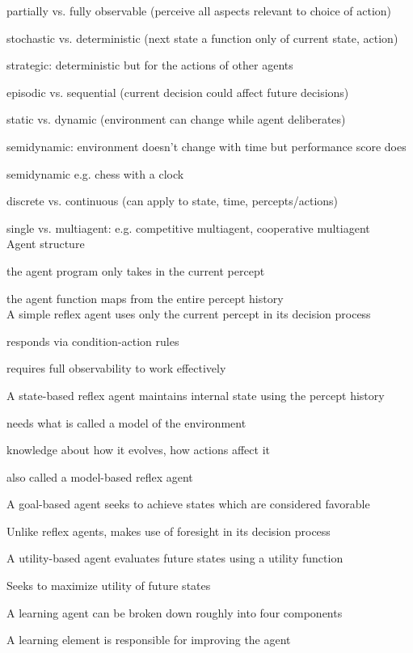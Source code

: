 \documentclass[12pt]{article}
\begin{document}
partially vs. fully observable (perceive all aspects relevant to choice of action)

stochastic vs. deterministic (next state a function only of current state, action)

strategic: deterministic but for the actions of other agents

episodic vs. sequential (current decision could affect future decisions)

static vs. dynamic (environment can change while agent deliberates)

semidynamic: environment doesn't change with time but performance score does

semidynamic e.g. chess with a clock

discrete vs. continuous (can apply to state, time, percepts/actions)

single vs. multiagent: e.g. competitive multiagent, cooperative multiagent\\

\noindent
Agent structure

the agent program only takes in the current percept

the agent function maps from the entire percept history\\

\noindent
A simple reflex agent uses only the current percept in its decision process

responds via condition-action rules

requires full observability to work effectively

\noindent
A state-based reflex agent maintains internal state using the percept history

needs what is called a model of the environment

knowledge about how it evolves, how actions affect it

also called a model-based reflex agent

\noindent
A goal-based agent seeks to achieve states which are considered favorable

Unlike reflex agents, makes use of foresight in its decision process

\noindent
A utility-based agent evaluates future states using a utility function

Seeks to maximize utility of future states

\noindent
A learning agent can be broken down roughly into four components

A learning element is responsible for improving the agent
\end{document}
